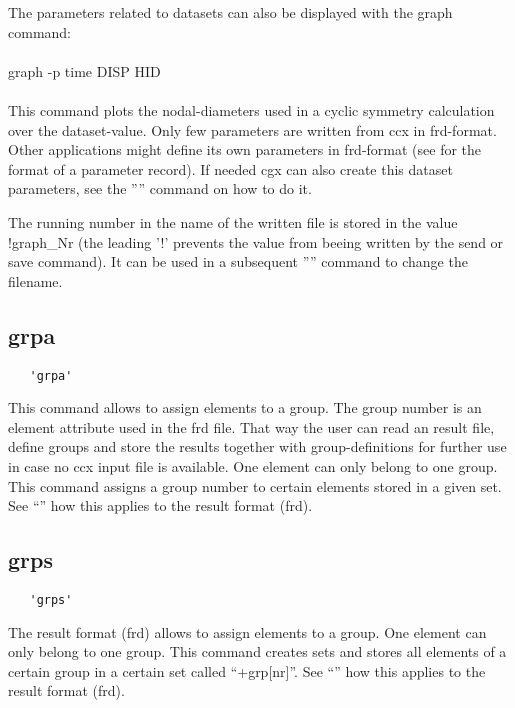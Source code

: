 \documentclass{article}
\begin{document}
The parameters related to datasets can also be displayed with the graph command:\\\\graph -p time DISP HID\\\\This command plots the nodal-diameters used in a cyclic symmetry calculation over the dataset-value. Only few parameters are written from ccx in frd-format. Other applications might define its own parameters in frd-format (see  for the format of a parameter record). If needed cgx can also create this dataset parameters, see the '''' command on how to do it. 

The running number in the name of the written file is stored in the value !graph\_Nr (the leading '!' prevents the value from beeing written by the send or save command). It can be used in a subsequent '''' command to change the filename.

\subsection{\label{grpa}grpa}
\begin{verbatim}
   'grpa'
\end{verbatim}
This command allows to assign elements to a group. The group number is an element attribute used in the frd file. That way the user can read an result file, define groups and store the results together with group-definitions for further use in case no ccx input file is available. One element can only belong to one group. This command assigns a group number to certain elements stored in a given set. See ``'' how this applies to the result format (frd).

\subsection{\label{grps}grps}
\begin{verbatim}
   'grps'
\end{verbatim}
The result format (frd) allows to assign elements to a group. One element can only belong to one group. This command creates sets and stores all elements of a certain group in a certain set called ``+grp[nr]''. See ``'' how this applies to the result format (frd).
\end{document}
